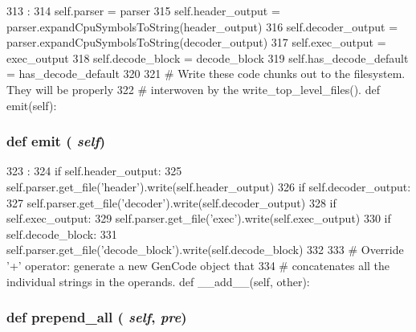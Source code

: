 \begin{DoxyCode}
313                                                                :
314         self.parser = parser
315         self.header_output = parser.expandCpuSymbolsToString(header_output)
316         self.decoder_output = parser.expandCpuSymbolsToString(decoder_output)
317         self.exec_output = exec_output
318         self.decode_block = decode_block
319         self.has_decode_default = has_decode_default
320 
321     # Write these code chunks out to the filesystem.  They will be properly
322     # interwoven by the write_top_level_files().
    def emit(self):
\end{DoxyCode}
\hypertarget{classisa__parser_1_1GenCode_a3b03091a972a5483895c3624c9118f35}{
\subsubsection[{emit}]{\setlength{\rightskip}{0pt plus 5cm}def emit ( {\em self})}}
\label{classisa__parser_1_1GenCode_a3b03091a972a5483895c3624c9118f35}



\begin{DoxyCode}
323                   :
324         if self.header_output:
325             self.parser.get_file('header').write(self.header_output)
326         if self.decoder_output:
327             self.parser.get_file('decoder').write(self.decoder_output)
328         if self.exec_output:
329             self.parser.get_file('exec').write(self.exec_output)
330         if self.decode_block:
331             self.parser.get_file('decode_block').write(self.decode_block)
332 
333     # Override '+' operator: generate a new GenCode object that
334     # concatenates all the individual strings in the operands.
    def __add__(self, other):
\end{DoxyCode}
\hypertarget{classisa__parser_1_1GenCode_a19d74bb433930fe364a5f156a7a12d4d}{
\subsubsection[{prepend\_\-all}]{\setlength{\rightskip}{0pt plus 5cm}def prepend\_\-all ( {\em self}, \/   {\em pre})}}
\label{classisa__parser_1_1GenCode_a19d74bb433930fe364a5f156a7a12d4d}



